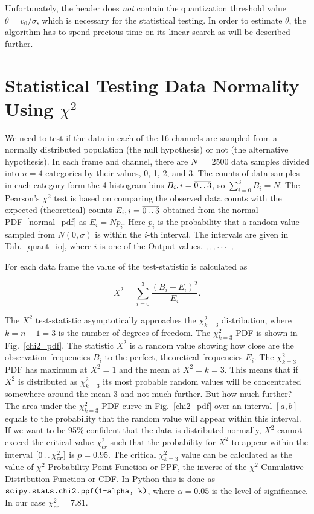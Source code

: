 \documentclass[letterpaper,twoside,12pt]{article}
\newcommand{\twodots}{\mathinner {\ldotp \ldotp}}
\begin{document}
Unfortunately, the header does \emph{not} contain the quantization threshold value $\theta = v_0/\sigma$, which is necessary for the statistical testing. In order to estimate $\theta$, the algorithm has to spend precious time on its linear search as will be described further. 




\section{Statistical Testing Data Normality Using $\chi^2$}

We need to test if the data in each of the 16 channels are sampled from a normally distributed population (the null hypothesis) or not (the alternative hypothesis). In each frame and channel, there are $N=$ 2500 data samples divided into $n=4$ categories by their values, 0, 1, 2, and 3. The counts of data samples in each category form the 4 histogram bins $B_i, i=\overline{0 \twodots 3}$, so $\sum_{i=0}^3 B_i = N$. The Pearson's $\chi^2$ test is based on comparing the observed data counts with the expected (theoretical) counts $E_i, i=\overline{0 \twodots 3}$ obtained from the normal PDF~\eqref{normal_pdf} as $E_i = Np_i$. Here $p_i$ is the probability that a random value sampled from $N(0,\sigma)$ is within the $i$-th interval. The intervals are given in Tab.~\ref{quant_io}, where $i$ is one of the Output values. $\ldots\cdots\ldotp\ldotp$

For each data frame the value of the test-statistic is calculated as

\begin{equation}
  \label{x2_calc}
  X^2 = \sum_{i=0}^3 \frac{(B_i - E_i)^2}{E_i}.
\end{equation}


The $X^2$ test-statistic asymptotically approaches the $\chi^2_{k=3}$ distribution, where $k = n - 1 = 3$ is the number of degrees of freedom. The $\chi^2_{k=3}$ PDF is shown in Fig.~\ref{chi2_pdf}. The statistic $X^2$ is a random value showing how close are the observation frequencies $B_i$ to the perfect, theoretical frequencies $E_i$. The $\chi^2_{k=3}$ PDF has maximum at $X^2=1$ and the mean at $X^2=k=3$. This means that if $X^2$ is distributed as $\chi^2_{k=3}$ its most probable random values will be concentrated somewhere around the mean 3 and not much further. But how much further? The area under the $\chi^2_{k=3}$ PDF curve in Fig.~\ref{chi2_pdf} over an interval $[a,b]$ equals to the probability that the random value will appear within this interval. If we want to be 95\% confident that the data is distributed normally, $X^2$ cannot exceed the critical value $\chi^2_{cr}$ such that the probability for $X^2$ to appear within the interval $[0 \twodots \chi^2_{cr}]$ is $p=0.95$. The critical $\chi^2_{k=3}$ value can be calculated as the value of $\chi^2$ Probability Point Function or PPF, the inverse of the $\chi^2$ Cumulative Distribution Function or CDF. In Python this is done as $\verb@scipy.stats.chi2.ppf(1-alpha, k)@$, where $\alpha = 0.05$ is the level of significance. In our case $\chi^2_{cr} = 7.81$. 
\end{document}
